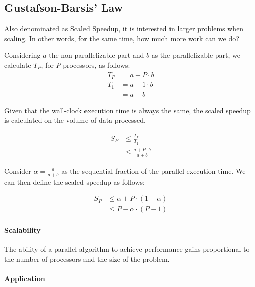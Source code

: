 \subsection{Gustafson-Barsis’ Law}

Also denominated as Scaled Speedup, it is interested in larger problems when scaling.
In other words, for the same time, how much more work can we do?

Considering $a$ the non-parallelizable part and $b$ as the parallelizable part,
we calculate $T_P$, for $P$ processors, as follows:
\begin{equation}
    \begin{split}
        T_P & = a + P \cdot b\\
        T_1 & = a + 1 \cdot b\\
        & = a + b
    \end{split}
\end{equation}

Given that the wall-clock execution time is always the same,
the scaled speedup is calculated on the volume of data processed.

\begin{equation}
    \begin{split}
        S_P & \le \frac{T_P}{T_1}\\
        & \le \frac{a + P \cdot b}{a + b}
    \end{split}
\end{equation}

Consider $\alpha = \frac{a}{a+b}$ as the sequential fraction of the parallel execution time.
We can then define the scaled speedup as follows:

\begin{equation}
    \begin{split}
        S_P & \le \alpha + P \cdot (1-\alpha)\\
        & \le P - \alpha \cdot (P-1)
    \end{split}
\end{equation}

\paragraph{Scalability}
The ability of a parallel algorithm to achieve performance gains proportional to the number of processors and the size of the problem.

\paragraph{Application}

